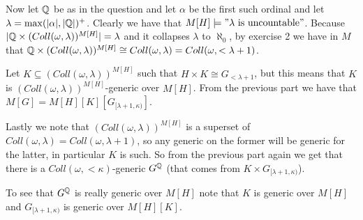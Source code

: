 \begin{cExercise}
\begin{cPart}
		Now let $\mathbb Q$ be as in the question and let $\alpha$ be the first such ordinal and let $\lambda=\max(|\alpha|, |\mathbb Q|)^+$. Clearly we have that $M[H]\models"\lambda\text{ is uncountable}"$. Because $|\mathbb Q\times (Coll(\omega,\lambda))^{M[H]}|=\lambda$ and it collapses $\lambda$ to $\aleph_0$, by exercise 2 we have in $M$ that $\mathbb Q\times (Coll(\omega,\lambda))^{M[H]}\cong Coll(\omega,\lambda)=Coll(\omega,<\lambda+1)$.
		
		Let $K\subseteq (Coll(\omega,\lambda))^{M[H]}$ such that $H\times K\cong G_{<\lambda+1}$, but this means that $K$ is $(Coll(\omega,\lambda))^{M[H]}$-generic over $M[H]$. From the previous part we have that $M[G]=M[H][K][G_{[\lambda+1,\kappa)}]$.
		
		Lastly we note that $(Coll(\omega,\lambda))^{M[H]}$ is a superset of $Coll(\omega,\lambda)=Coll(\omega,\lambda+1)$, so any generic on the former will be generic for the latter, in particular $K$ is such. So from the previous part again we get that there is a $Coll(\omega,<\kappa)$-generic $G^\mathbb Q$ (that comes from $K\times G_{[\lambda+1,\kappa)}$).
		
		To see that $G^\mathbb Q$ is really generic over $M[H]$ note that $K$ is generic over $M[H]$ and $G_{[\lambda+1,\kappa)}$ is generic over $M[H][K]$.
	\end{cPart}
\end{cExercise}





